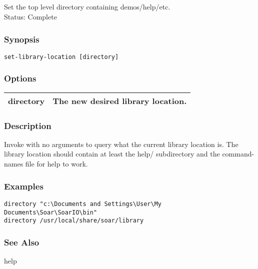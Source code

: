 \subsection{}
\label{set-library-location}
Set the top level directory containing demos/help/etc.\\ 
 Status: Complete
\subsubsection*{Synopsis}
\begin{verbatim}
set-library-location [directory] 
\end{verbatim}
\subsubsection*{Options}
\begin{tabular}{|l|l|}
\hline 
 directory  & The new desired library location.  \\
 \hline 
\end{tabular}
\subsubsection*{Description}
 Invoke with no arguments to query what the current library location is. The library location should contain at least the help/ subdirectory and the command-names file for help to work. 
\subsubsection*{Examples}
\begin{verbatim}
directory "c:\Documents and Settings\User\My Documents\Soar\SoarIO\bin"
directory /usr/local/share/soar/library
\end{verbatim}
\subsubsection*{See Also}
 help
